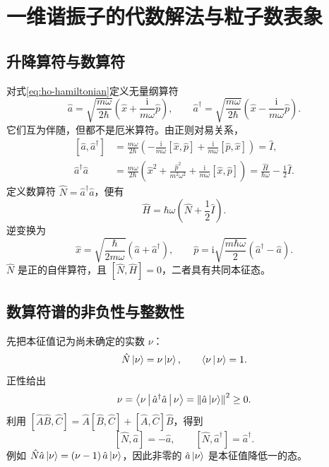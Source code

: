 \section{一维谐振子的代数解法与粒子数表象}
\subsection{升降算符与数算符}
对式\eqref{eq:ho-hamiltonian}定义无量纲算符
\begin{equation}
\hat a=\sqrt{\frac{m\omega}{2\hbar}}\left(\hat x+\frac{\mathrm{i}}{m\omega}\hat p\right),\qquad
\hat a^\dagger=\sqrt{\frac{m\omega}{2\hbar}}\left(\hat x-\frac{\mathrm{i}}{m\omega}\hat p\right).
\end{equation}
它们互为伴随，但都不是厄米算符。由正则对易关系，
\begin{align}
\left[\hat a,\hat a^\dagger\right]
&=\frac{m\omega}{2\hbar}\left(-\frac{\mathrm{i}}{m\omega}\left[\hat x,\hat p\right]
+\frac{\mathrm{i}}{m\omega}\left[\hat p,\hat x\right]\right)=\hat I,\\
\hat a^\dagger\hat a
&=\frac{m\omega}{2\hbar}\left(\hat x^2+\frac{\hat p^2}{m^2\omega^2}
+\frac{\mathrm{i}}{m\omega}\left[\hat x,\hat p\right]\right)
=\frac{\hat H}{\hbar\omega}-\frac12\hat I.
\end{align}
定义数算符 $\hat N=\hat a^\dagger\hat a$，便有
\begin{equation}
\boxed{\hat H=\hbar\omega\left(\hat N+\frac12\hat I\right).}
\label{eq:H-N}
\end{equation}
逆变换为
\begin{equation}
\hat x=\sqrt{\frac{\hbar}{2m\omega}}\left(\hat a+\hat a^\dagger\right),\qquad
\hat p=\mathrm{i}\sqrt{\frac{m\hbar\omega}{2}}\left(\hat a^\dagger-\hat a\right).
\label{eq:xp-ladder}
\end{equation}
$\hat N$ 是正的自伴算符，且 $\left[\hat N,\hat H\right]=0$，二者具有共同本征态。

\subsection{数算符谱的非负性与整数性}
先把本征值记为尚未确定的实数 $\nu$：
\begin{equation}
\hat N\Ket{\nu}=\nu\Ket{\nu},\qquad\Braket{\nu|\nu}=1.
\end{equation}
正性给出
\begin{equation}
\nu=\Braket{\nu|\hat a^\dagger\hat a|\nu}
=\left\|\hat a\Ket{\nu}\right\|^2\geq0.
\end{equation}
利用 $\left[\hat A\hat B,\hat C\right]=\hat A\left[\hat B,\hat C\right]+\left[\hat A,\hat C\right]\hat B$，得到
\begin{equation}
\left[\hat N,\hat a\right]=-\hat a,\qquad \left[\hat N,\hat a^\dagger\right]=\hat a^\dagger.
\label{eq:N-ladder}
\end{equation}
例如 $\hat N\hat a\Ket{\nu}=\left(\nu-1\right)\hat a\Ket{\nu}$，因此非零的 $\hat a\Ket{\nu}$ 是本征值降低一的态。


